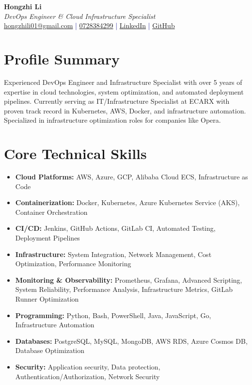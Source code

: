 \documentclass[11pt,a4paper]{article}
\begin{document}
\pagestyle{empty} %

\begin{center}
{\LARGE \textbf{Hongzhi Li}}\\[10pt]
{\Large \textit{DevOps Engineer \& Cloud Infrastructure Specialist}}\\[10pt]
\textcolor{darkblue}{\href{mailto:hongzhili01@gmail.com}{hongzhili01@gmail.com} | \href{tel:0728384299}{0728384299} | \href{https://www.linkedin.com/in/hzl/}{LinkedIn} | \href{https://github.com/bluehawana}{GitHub}}
\end{center}

\section*{Profile Summary}
Experienced DevOps Engineer and Infrastructure Specialist with over 5 years of expertise in cloud technologies, system optimization, and automated deployment pipelines. Currently serving as IT/Infrastructure Specialist at ECARX with proven track record in Kubernetes, AWS, Docker, and infrastructure automation. Specialized in infrastructure optimization roles for companies like Opera.

\section*{Core Technical Skills}
\begin{itemize}[noitemsep]
\item \textbf{Cloud Platforms:} AWS, Azure, GCP, Alibaba Cloud ECS, Infrastructure as Code
\item \textbf{Containerization:} Docker, Kubernetes, Azure Kubernetes Service (AKS), Container Orchestration
\item \textbf{CI/CD:} Jenkins, GitHub Actions, GitLab CI, Automated Testing, Deployment Pipelines
\item \textbf{Infrastructure:} System Integration, Network Management, Cost Optimization, Performance Monitoring
\item \textbf{Monitoring \& Observability:} Prometheus, Grafana, Advanced Scripting, System Reliability, Performance Analysis, Infrastructure Metrics, GitLab Runner Optimization
\item \textbf{Programming:} Python, Bash, PowerShell, Java, JavaScript, Go, Infrastructure Automation
\item \textbf{Databases:} PostgreSQL, MySQL, MongoDB, AWS RDS, Azure Cosmos DB, Database Optimization
\item \textbf{Security:} Application security, Data protection, Authentication/Authorization, Network Security
\end{itemize}
\end{document}
